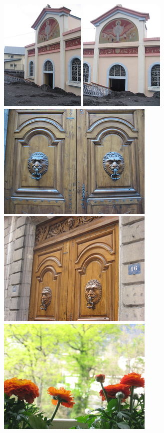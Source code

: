 \documentclass[10pt,conference,a4paper]{IEEEtran}
\begin{document}
\begin{figure}
			\resizebox{1.975\columnwidth}{!}
			{
				\includegraphics[scale=0.82]{inria1.jpg}
				\includegraphics[scale=0.82]{inria2.jpg}
				\includegraphics[scale=0.82]{inria3.jpg}
				\includegraphics[scale=0.82]{inria4.jpg}
				\includegraphics[scale=0.82]{inria5.jpg}
}
\end{figure}
\end{document}
